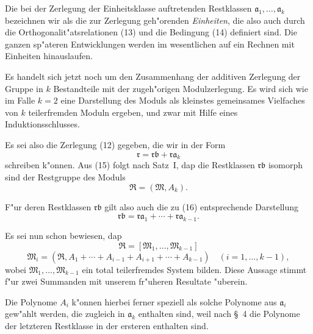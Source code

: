 \documentclass[12pt,a4paper]{article}
\begin{document}
Die bei der Zerlegung der Einheitsklasse auftretenden Restklassen $\mathfrak{a}_1,\ldots,\mathfrak{a}_k$ bezeichnen wir als die zur Zerlegung geh"orenden \emph{Einheiten}, die also auch durch die Orthogonalit"atsrelationen (13) und die Bedingung (14) definiert sind. Die ganzen sp"ateren Entwicklungen werden im wesentlichen auf ein Rechnen mit Einheiten hinauslaufen.

Es handelt sich jetzt noch um den Zusammenhang der additiven Zerlegung der Gruppe in $k$ Bestandteile mit der zugeh"origen Modulzerlegung. Es wird sich wie im Falle $k=2$ eine Darstellung des Moduls als kleinstes gemeinsames Vielfaches von $k$ teilerfremden Moduln ergeben, und zwar mit Hilfe eines Induktionsschlusses.

Es sei also die Zerlegung (12) gegeben, die wir in der Form
\begin{equation}
\mathfrak{r} = \mathfrak{r}\mathfrak{b} + \mathfrak{r}\mathfrak{a}_k \tag{15}
\end{equation}
schreiben k"onnen. Aus (15) folgt nach Satz~I, dap die Restklassen $\mathfrak{r}\mathfrak{b}$ isomorph sind der Restgruppe des Moduls
\begin{equation}
\mathfrak{R} = (\mathfrak{M}, A_k). \tag{17}
\end{equation}

F"ur deren Restklassen $\mathfrak{r}\mathfrak{b}$ gilt also auch die zu (16) entsprechende Darstellung
\begin{equation}
\mathfrak{r}\mathfrak{b} = \mathfrak{r}\mathfrak{a}_1 + \cdots + \mathfrak{r}\mathfrak{a}_{k-1}. \tag{18}
\end{equation}

Es sei nun schon bewiesen, dap
\begin{equation}
\mathfrak{R} = [\mathfrak{M}_1, \ldots, \mathfrak{M}_{k-1}] \tag{19}
\end{equation}
\begin{equation}
\mathfrak{M}_i = (\mathfrak{R}, A_1 + \cdots + A_{i-1} + A_{i+1} + \cdots + A_{k-1}) \quad (i=1,\ldots,k-1), \tag{20}
\end{equation}
wobei $\mathfrak{M}_1,\ldots,\mathfrak{M}_{k-1}$ ein total teilerfremdes System bilden. Diese Aussage stimmt f"ur zwei Summanden mit unserem fr"uheren Resultate "uberein.

Die Polynome $A_i$ k"onnen hierbei ferner speziell als solche Polynome aus $\mathfrak{a}_i$ gew"ahlt werden, die zugleich in $\mathfrak{a}_k$ enthalten sind, weil nach \S\ 4 die Polynome der letzteren Restklasse in der ersteren enthalten sind.
\end{document}
